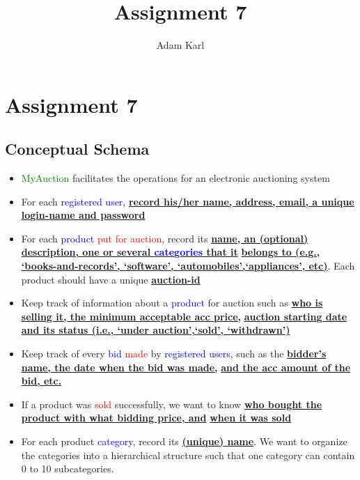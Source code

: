 \documentclass[a4paper]{article}
\title{Assignment 7}
\author{Adam Karl}
\begin{document}
\maketitle

\section{Assignment 7}
\subsection{Conceptual Schema}
\begin{itemize}
    \item \textcolor{green}{MyAuction} facilitates  the  operations  for  an  electronic  auctioning  system
    \item For each \textcolor{blue}{registered user}, \textbf{\underline{ record his/her name, address, email, a unique login-name and password}} 
    \item For  each  \textcolor{blue}{product}  \textcolor{red}{put  for  auction},  record  its  \textbf{\underline{name,  an  (optional)  description,  one  or several  \textcolor{blue}{categories} that it}} \textbf{\underline{belongs to (e.g., ‘books-and-records’, ‘software’, ‘automobiles’,‘appliances’, etc)}}.  Each product should have a unique \textbf{\underline{auction-id}}
    \item Keep track of information about a \textcolor{blue}{product} for auction such as \textbf{\underline{who is selling it, the minimum acceptable acc price,}} \textbf{\underline{auction starting date and its status (i.e., ‘under auction’,‘sold’, ‘withdrawn’)}}
    \item Keep track of every \textcolor{blue}{bid} \textcolor{red}{made} by \textcolor{blue}{registered users}, such as the \textbf{\underline{bidder’s name, the date when the bid was made,}} \textbf{\underline{and the acc amount of the bid, etc.}}
    \item If a product was \textcolor{red}{sold} successfully, we want to know \textbf{\underline{who bought the product with what bidding price, and}} \textbf{\underline{when it was sold}}
    \item For each product \textcolor{blue}{category}, record its \textbf{\underline{(unique) name}}.  We want to organize the categories into a hierarchical structure such that one category can contain 0 to 10 subcategories.
\end{itemize}
\end{document}
